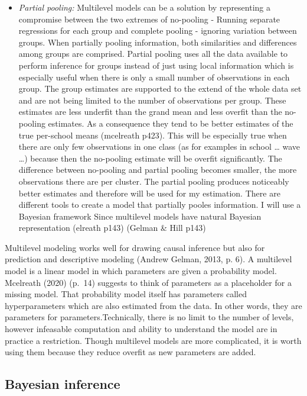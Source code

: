 \documentclass[a4, 12pt]{article}
\providecommand{\tightlist}{%
  \setlength{\itemsep}{0pt}\setlength{\parskip}{0pt}}
\begin{document}
\begin{itemize}
\tightlist
\item
  \emph{Partial pooling:}
  Multilevel models can be a solution by representing a compromise between the two extremes of no-pooling - Running separate regressions for each group and complete pooling - ignoring variation between groups. When partially pooling information, both similarities and differences among groups are comprised. Partial pooling uses all the data available to perform inference for groups instead of just using local information which is especially useful when there is only a small number of observations in each group. The group estimates are supported to the extend of the whole data set and are not being limited to the number of observations per group. These estimates are less underfit than the grand mean and less overfit than the no-pooling estimates. As a consequence they tend to be better estimates of the true per-school means (mcelreath p423). This will be especially true when there are only few observations in one class (as for examples in school \ldots{} wave \ldots) because then the no-pooling estimate will be overfit significantly. The difference between no-pooling and partial pooling becomes smaller, the more observations there are per cluster. The partial pooling produces noticeably better estimates and therefore will be used for my estimation. There are different tools to create a model that partially pooles information. I will use a Bayesian framework Since multilevel models have natural Bayesian representation (elreath p143) (Gelman \& Hill p143)
\end{itemize}

Multilevel modeling works well for drawing causal inference but also for prediction and descriptive modeling (Andrew Gelman, 2013, p. 6). A multilevel model is a linear model in which parameters are given a probability model. Mcelreath (2020) (p.~14) suggests to think of parameters as a placeholder for a missing model. That probability model itself has parameters called hyperparameters which are also estimated from the data. In other words, they are parameters for parameters.Technically, there is no limit to the number of levels, however infeasable computation and ability to understand the model are in practice a restriction. Though multilevel models are more complicated, it is worth using them because they reduce overfit as new parameters are added.

\hypertarget{bayesian-inference}{%
\subsection{Bayesian inference}\label{bayesian-inference}}
\end{document}
